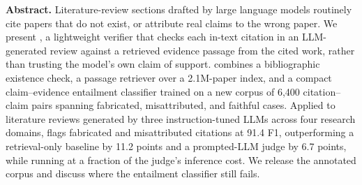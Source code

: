 \documentclass[10pt,twocolumn]{article}
\begin{document}
{\begin{center}
\begin{minipage}{0.92\textwidth}
\small
\textbf{Abstract.} Literature-review sections drafted by large language
models routinely cite papers that do not exist, or attribute real claims to
the wrong paper. We present , a lightweight verifier that
checks each in-text citation in an LLM-generated review against a retrieved
evidence passage from the cited work, rather than trusting the model's own
claim of support.  combines a bibliographic existence
check, a passage retriever over a 2.1M-paper index, and a compact
claim--evidence entailment classifier trained on a new corpus of 6,400
citation--claim pairs spanning fabricated, misattributed, and faithful
cases. Applied to literature reviews generated by three instruction-tuned
LLMs across four research domains,  flags fabricated and
misattributed citations at 91.4 F1, outperforming a retrieval-only baseline
by 11.2 points and a prompted-LLM judge by 6.7 points, while running at a
fraction of the judge's inference cost. We release the annotated corpus and
discuss where the entailment classifier still fails.
\end{minipage}
\end{center}
\vspace{1.1em}
}

\twocolumn[\PaperTitleBlock]









\end{document}
